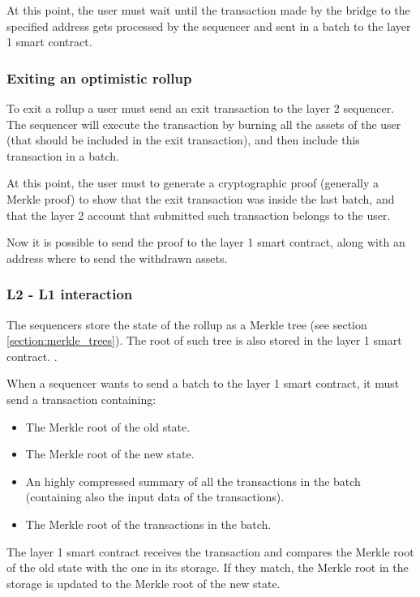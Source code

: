 \documentclass[12pt]{article}
\begin{document}
At this point, the user must wait until the transaction made by the bridge to the specified address gets processed by the sequencer and sent in a batch to the layer 1 smart contract.

\subsubsection{Exiting an optimistic rollup} \label{subsubsection:exiting_optimistic_rollup}
To exit a rollup a user must send an exit transaction to the layer 2 sequencer. The sequencer will execute the transaction by burning all the assets of the user (that should be included in the exit transaction), and then include this transaction in a batch.

At this point, the user must to generate a cryptographic proof (generally a Merkle proof) to show that the exit transaction was inside the last batch, and that the layer 2 account that submitted such transaction belongs to the user.

Now it is possible to send the proof to the layer 1 smart contract, along with an address where to send the withdrawn assets.

\subsubsection{L2 - L1 interaction} \label{subsubsection:l2l1i}
The sequencers store the state of the rollup as a Merkle tree (see section \ref{section:merkle_trees}). The root of such tree is also stored in the layer 1 smart contract. \cite{optimistic_rollups}.

When a sequencer wants to send a batch to the layer 1 smart contract, it must send a transaction containing:
\begin{itemize}
    \item The Merkle root of the old state.
    \item The Merkle root of the new state.
    \item An highly compressed summary of all the transactions in the batch (containing also the input data of the transactions).
    \item The Merkle root of the transactions in the batch.
\end{itemize}

The layer 1 smart contract receives the transaction and compares the Merkle root of the old state with the one in its storage. If they match, the Merkle root in the storage is updated to the Merkle root of the new state.
\end{document}
